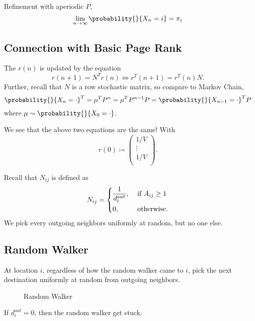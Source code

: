 Refinement with aperiodic \(P\),
\[
	\lim_{n\to \infty }\probability{}{X_n = i} = \pi_i
\]

\subsection{Connection with Basic Page Rank}
\begin{prev}
	The \(r(n)\) is updated by the equation
	\[
		r(n+1) = N^{T}r(n) \iff r^{T}(n+1) = r^{T}(n)N.
	\]
	Further, recall that \(N\) is a row stochastic matrix, so compare to Markov Chain,
	\[
		\probability{}{X_n = \cdot}^{T} = \mu^{T}P^n = \mu^{T}P^{n-1}P = \probability{}{X_{n-1} = \cdot}^{T}P
	\]
	where \(\mu\sim \probability{}{X_0 = \cdot}\).

	We see that the above two equations are the same! With
	\[
		r(0)\coloneqq \begin{pmatrix}
			1/V    \\
			\vdots \\
			1/V    \\
		\end{pmatrix}.
	\]
\end{prev}

Recall that \(N_{ij}\) is defined as
\[
	N_{ij} = \begin{dcases}
		\frac{1}{d_i^{out}}, & \text{ if }A_{ij}\geq 1 \\
		0,                   & \text{ otherwise}.
	\end{dcases}
\]
We pick every outgoing neighbors uniformly at random, but no one else.

\subsection{Random Walker}
\begin{intuition}
	At location \(i\), regardless of how the random walker came to \(i\), pick the next destination uniformly at random from outgoing neighbors.
\end{intuition}

\begin{figure}[H]
	\centering
	\caption{Random Walker}
	\label{fig:random-walker}
\end{figure}

\begin{note}
	If \(d_i^{out} = 0\), then the random walker get stuck.
\end{note}